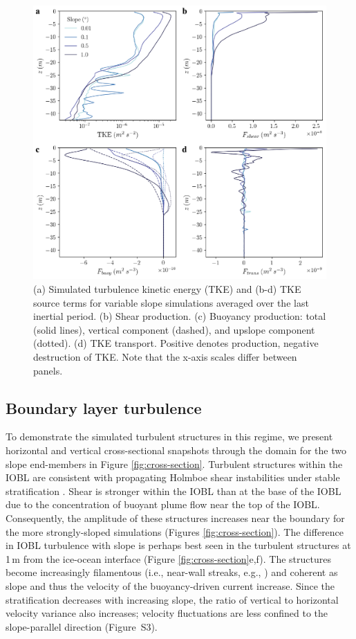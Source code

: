 \documentclass[tc, manuscript]{copernicus}
\begin{document}
\begin{figure}[t]
\includegraphics[width=12cm]{fig4.pdf}
\caption{(a) Simulated turbulence kinetic energy (TKE) and (b-d) TKE source terms for variable slope simulations averaged over the last inertial period. (b) Shear production. (c) Buoyancy production: total (solid lines), vertical component (dashed), and upslope component (dotted). (d) TKE transport. Positive denotes production, negative destruction of TKE. Note that the x-axis scales differ between panels.}
\label{fig:tke_budget}
\end{figure}


\subsection{Boundary layer turbulence}
To demonstrate the simulated turbulent structures in this regime, we present horizontal and vertical cross-sectional  snapshots through the domain for the two slope end-members in Figure \ref{fig:cross-section}. Turbulent structures within the IOBL are consistent with propagating Holmboe shear instabilities under stable stratification \citep{carpenter_identifying_2010}. Shear is stronger within the IOBL than at the base of the IOBL due to the concentration of buoyant plume flow near the top of the IOBL. Consequently, the amplitude of these structures increases near the boundary for the more strongly-sloped simulations (Figures \ref{fig:cross-section}). The difference in IOBL turbulence with slope is perhaps best seen in the turbulent structures at 1\,\unit{m} from the ice-ocean interface (Figure \ref{fig:cross-section}e,f). The structures become increasingly filamentous (i.e., near-wall streaks, e.g., \citet{del_alamo_spectra_2003, hoyas_scaling_2006}) and coherent as slope and thus the velocity of the buoyancy-driven current increase. Since the stratification decreases with increasing slope, the ratio of vertical to horizontal velocity variance also increases; velocity fluctuations are less confined to the slope-parallel direction (Figure~S3).
\end{document}
